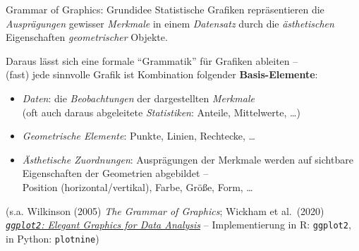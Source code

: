 \documentclass[
  10pt,
  ignorenonframetext,
]{beamer}
\providecommand{\tightlist}{%
  \setlength{\itemsep}{0pt}\setlength{\parskip}{0pt}}
\begin{document}
\begin{frame}[fragile]{Grammar of Graphics: Grundidee}
\protect\hypertarget{grammar-of-graphics-grundidee}{}
Statistische Grafiken repräsentieren die \emph{Ausprägungen} gewisser
\emph{Merkmale} in einem \emph{Datensatz} durch die \emph{ästhetischen}
Eigenschaften \emph{geometrischer} Objekte.

Daraus lässt sich eine formale ``Grammatik'' für Grafiken ableiten --\\
(fast) jede sinnvolle Grafik ist Kombination folgender
\textbf{Basis-Elemente}:

\begin{itemize}
\tightlist
\item
  \emph{Daten}: die \emph{Beobachtungen} der dargestellten
  \emph{Merkmale}\\
  (oft auch daraus abgeleitete \emph{Statistiken}: Anteile, Mittelwerte,
  \ldots)
\item
  \emph{Geometrische Elemente}: Punkte, Linien, Rechtecke, \ldots{}
\item
  \emph{Ästhetische Zuordnungen}: Ausprägungen der Merkmale werden auf
  sichtbare Eigenschaften der Geometrien abgebildet --\\
  Position (horizontal/vertikal), Farbe, Größe, Form, \ldots{}
\end{itemize}

\vspace{0pt plus 1filll}
\footnotesize

(s.a. Wilkinson (2005) \emph{The Grammar of Graphics}; Wickham et
al.~(2020) \href{https://ggplot2-book.org/}{\emph{\texttt{ggplot2}:
Elegant Graphics for Data Analysis}} -- Implementierung in R:
\texttt{ggplot2}, in Python: \texttt{plotnine})
\end{frame}
\end{document}

